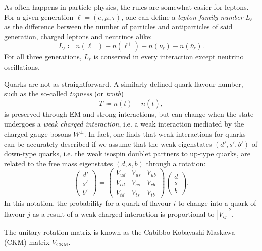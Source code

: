 As often happens in particle physics, the rules are somewhat easier for leptons. For a given generation $\ell = (e,\mu,\tau)$, one can define a \textit{lepton family number} $L_\ell$ as the difference between the number of particles and antiparticles of said generation, charged leptons and neutrinos alike:
\begin{equation}
L_\ell
\coloneqq
n(\ell^-) - n(\ell^+)
+
n(\nu_\ell) - n(\bar{\nu}_\ell).
\end{equation}
For all three generations, $L_\ell$ is conserved in every interaction except neutrino oscillations.

Quarks are not as straightforward.
A similarly defined quark flavour number, such as the so-called \textit{topness} (or \textit{truth})
\begin{equation}
T
\coloneqq
n(t) - n(\bar{t}),
\end{equation}
is preserved through EM and strong interactions, but can change when the state undergoes a \textit{weak charged interaction}, i.e. a weak interaction mediated by the charged gauge bosons $W^\pm$. In fact, one finds that weak interactions for quarks can be accurately described if we assume that the weak eigenstates $(d',s',b')$ of down-type quarks, i.e. the weak isospin doublet partners to up-type quarks, are related to the free mass eigenstates $(d,s,b)$ through a rotation:
\begin{equation}
	\begin{pmatrix}
		d' \\
		s' \\
		b'
	\end{pmatrix}
	=
	\begin{pmatrix}
		V_{ud} & V_{us} & V_{ub} \\
		V_{cd} & V_{cs} & V_{cb} \\
		V_{td} & V_{ts} & V_{tb}
	\end{pmatrix}
	\begin{pmatrix}
		d \\
		s \\
		b
	\end{pmatrix}.
	\label{eq:CKM_matrix}
\end{equation}
In this notation, the probability for a quark of flavour $i$ to change into a quark of flavour $j$ as a result of a weak charged interaction is proportional to ${\left| V_{ij} \right|}^2$.

The unitary rotation matrix is known as the Cabibbo-Kobayashi-Maskawa (CKM) matrix $V_\text{CKM}$.

